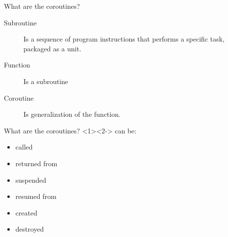 \documentclass[10pt]{beamer}
\begin{document}
\begin{frame}{What are the coroutines?}
\vfill

\begin{description}
	\item [Subroutine] Is a sequence of program instructions that performs a specific task, packaged as a unit.
	\item [Function] Is a subroutine
	\item [Coroutine] Is generalization of the function.
\end{description}

\vfill
\end{frame}

\begin{frame}{What are the coroutines?}
	\alert{<2->} can be:
	\begin{itemize}
		\item called
		\item returned from
		\item<2-|alert@2> \alert<+>{suspended}
		\item<3-|alert@3> resumed from
		\item<4-|alert@4> created
		\item<5-|alert@5> destroyed
	\end{itemize}
\end{frame}
\end{document}
